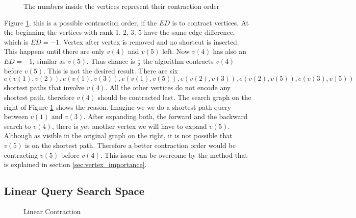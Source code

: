\begin{figure}
    \centering
    
    \caption{The numbers inside the vertices represent their contraction order}
    \label{fig:not_contracted_last}
\end{figure}

Figure \ref{fig:not_contracted_last}, this is a possible contraction order, if the $ED$ is to contract vertices.
At the beginning the vertices with rank 1, 2, 3, 5 have the same edge difference, which is $ED = -1$.
Vertex after vertex is removed  and  no shortcut is inserted.
This happens until there are only $v(4)$ and $v(5)$ left.
Now $v(4)$ has also an $ED=-1$, similar as $v(5)$.
Thus chance is $\frac{1}{2}$ the algorithm contracts $v(4)$ before $v(5)$.
This is not the desired result.
There are six \\$e(v(1),v(2)), e(v(1),v(3)), e(v(1),v(5)), e(v(2),v(3)), e(v(2),v(5)), e(v(3),v(5))$  shortest paths that involve  $v(4)$. 
All the other vertices do not encode any shortest path, therefore $v(4)$ should be contracted last.
The search graph on the right of Figure \ref{fig:not_contracted_last} shows the reason.
Imagine we we do a shortest path query between $v(1)$ and $v(3)$.
After expanding both, the forward and the backward search to $v(4)$, there is yet another vertex we will have to expand $v(5)$.
Although as visible in the original graph on the right, it is not possible that $v(5)$ is on the shortest path.
Therefore a better contraction order would be contracting $v(5)$ before $v(4)$.
This issue can be overcome by the method that is explained in section \ref{sec:vertex_importance}.

\subsection{Linear Query Search Space}\label{sec:linear_query}

\begin{figure}
\centering

\caption{Linear Contraction}
\label{fig:linear_contraction}
\end{figure}

